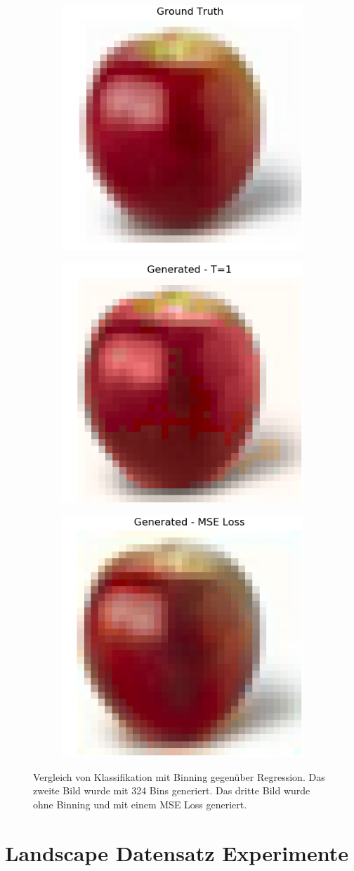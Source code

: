 \begin{figure}[H]
  \centering
  \vspace{1cm}
  \begin{subfigure}
    \centering
    \includegraphics[width=.28\textwidth]{resources/experiments/cifar/311_original.png}
  \end{subfigure}
  \begin{subfigure}
    \centering
    \includegraphics[width=.28\textwidth]{resources/experiments/cifar/311_t1.png}
  \end{subfigure}
  \begin{subfigure}
    \centering
    \includegraphics[width=.28\textwidth]{resources/experiments/cifar/311_regression.png}
  \end{subfigure}

  \caption{Vergleich von Klassifikation mit Binning gegenüber Regression. Das zweite Bild wurde mit 324 Bins generiert.
  Das dritte Bild wurde ohne Binning und mit einem MSE Loss generiert.}
  \label{image:gute-ergebnisse-cifar}
\end{figure}

\section{Landscape Datensatz Experimente}

